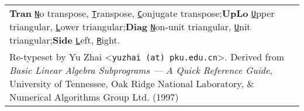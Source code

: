 \documentclass[10pt,a3paper, landscape]{article}
\newcommand{\key}[1]{\underline{\texttt{#1}}}
\begin{document}
\begin{tabular}{ll>{\ttfamily}l}
		\multicolumn{3}{l}{\small\textbf{Tran}\; \key{N}o transpose, \key{T}ranspose, \key{C}onjugate transpose;\quad \textbf{UpLo}\; \key{U}pper triangular, \key{L}ower triangular;\quad\textbf{Diag}\; \key{N}on-unit triangular, \key{U}nit triangular;\quad\textbf{Side}\; \key{L}eft, \key{R}ight.}                                                                                    \\
		\multicolumn{3}{l}{\scriptsize Re-typeset by Yu Zhai <\texttt{yuzhai (at) pku.edu.cn}>. Derived from \emph{Basic Linear Algebra Subprograms --- A Quick Reference Guide}, University of Tennessee, Oak Ridge National Laboratory, \& Numerical Algorithms Group Ltd. (1997)}
	\end{tabular}
		

	
	
	
	
\end{document}
